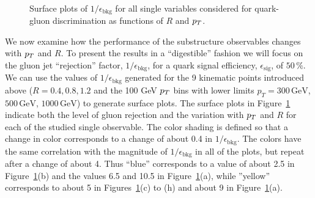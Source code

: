 \begin{figure}
\\
\caption{Surface plots of $1/\epsilon_\text{bkg}$ for all single variables considered for
  quark-gluon discrimination as functions of $R$ and $p_T$. }
\label{fig:qg_surface_single}
\end{figure}
%

We now examine how the performance of the substructure observables changes with $p_T$ and $R$.  To present the results in a ``digestible'' fashion
we will focus on the gluon jet ``rejection'' factor, $1/\epsilon_\text{bkg}$, for a quark signal efficiency, $\epsilon_\text{sig}$, of $50\,\%$.
We can use the values of $1/\epsilon_\text{bkg}$ generated for the 9 kinematic points introduced above ($R = 0.4, 0.8, 1.2$ and 
the 100 GeV $p_T$ bins with lower limits
$p_T = 300\, \text{GeV}$, $500\, \text{GeV}$, $1000\,\text{GeV}$) to generate surface plots.  The surface plots in Figure~\ref{fig:qg_surface_single}
indicate both the level of gluon rejection
and the variation with $p_T$ and $R$ for each of the studied single observable.  The color shading is defined so that a change in color 
corresponds to a change of about 0.4 in $1/\epsilon_\text{bkg}$.  The colors have the same correlation with the magnitude of $1/\epsilon_\text{bkg}$
in all of the plots, but repeat after a change of about 4.  Thus ``blue'' corresponds to a value of about 2.5 in  Figure~\ref{fig:qg_surface_single}(b) and the
values 6.5 and 10.5
in  Figure~\ref{fig:qg_surface_single}(a), while ''yellow'' corresponds to about 5 in  Figures~\ref{fig:qg_surface_single}(c) to (h) and about 9 in
 Figure~\ref{fig:qg_surface_single}(a).

